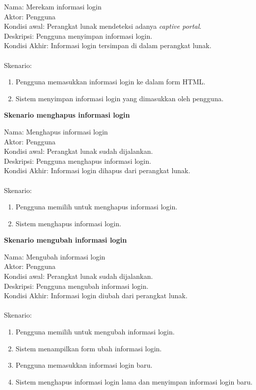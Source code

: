 \documentclass[a4paper,twoside]{article}
\begin{document}
\begin{enumerate}
        Nama: Merekam informasi login\\
        Aktor: Pengguna\\
        Kondisi awal: Perangkat lunak mendeteksi adanya \textit{captive portal}.\\
        Deskripsi: Pengguna menyimpan informasi login.\\
        Kondisi Akhir: Informasi login tersimpan di dalam perangkat lunak.\\\\
        Skenario:
        \begin{enumerate}
            \item{Pengguna memasukkan informasi login ke dalam form HTML.}
            \item{Sistem menyimpan informasi login yang dimasukkan oleh pengguna.}
        \end{enumerate}

        \textbf{Skenario menghapus informasi login}
        
        Nama: Menghapus informasi login\\
        Aktor: Pengguna\\
        Kondisi awal: Perangkat lunak sudah dijalankan.\\
        Deskripsi: Pengguna menghapus informasi login.\\
        Kondisi Akhir: Informasi login dihapus dari perangkat lunak.\\\\
        Skenario:
        \begin{enumerate}
            \item{Pengguna memilih untuk menghapus informasi login.}
            \item{Sistem menghapus informasi login.}
        \end{enumerate}

        \textbf{Skenario mengubah informasi login}
        
        Nama: Mengubah informasi login\\
        Aktor: Pengguna\\
        Kondisi awal: Perangkat lunak sudah dijalankan.\\
        Deskripsi: Pengguna mengubah informasi login.\\
        Kondisi Akhir: Informasi login diubah dari perangkat lunak.\\\\
        Skenario:
        \begin{enumerate}
            \item{Pengguna memilih untuk mengubah informasi login.}
            \item{Sistem menampilkan form ubah informasi login.}
            \item{Pengguna memasukkan informasi login baru.}
            \item{Sistem menghapus informasi login lama dan menyimpan informasi login baru.}
        \end{enumerate}
        

\end{enumerate}
\end{document}
